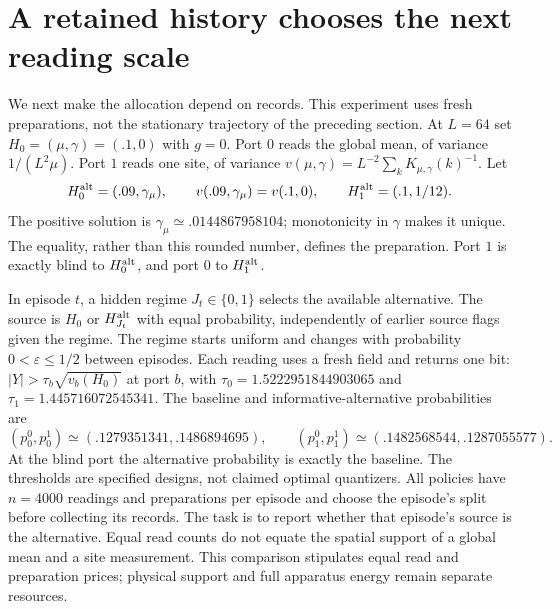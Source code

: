 \documentclass[12pt,a4paper]{article}
\begin{document}
\section{A retained history chooses the next reading scale}
\label{sec:history-scale}

We next make the allocation depend on records. This experiment uses
fresh preparations, not the stationary trajectory of the preceding
section. At $L=64$ set $H_0=(\mu,\gamma)=(.1,0)$ with $g=0$.
Port $0$ reads the global mean, of variance $1/(L^2\mu)$.
Port $1$ reads one site, of variance
$v(\mu,\gamma)=L^{-2}\sum_k K_{\mu,\gamma}(k)^{-1}$.
Let
\[
 H_0^{\rm alt}=(.09,\gamma_\mu),\qquad
 v(.09,\gamma_\mu)=v(.1,0),\qquad
 H_1^{\rm alt}=(.1,1/12).
\]
The positive solution is $\gamma_\mu\simeq .0144867958104$;
monotonicity in $\gamma$ makes it unique. The equality, rather than
this rounded number, defines the preparation. Port $1$ is exactly
blind to $H_0^{\rm alt}$, and port $0$ to $H_1^{\rm alt}$.

In episode $t$, a hidden regime $J_t\in\{0,1\}$ selects the available
alternative. The source is $H_0$ or $H_{J_t}^{\rm alt}$ with equal
probability, independently of earlier source flags given the regime.
The regime starts uniform and changes with probability
$0<\varepsilon\leq1/2$ between episodes. Each reading uses a fresh
field and returns one bit:
$|Y|>\tau_b\sqrt{v_b(H_0)}$ at port $b$, with
$\tau_0=1.5222951844903065$ and $\tau_1=1.445716072545341$.
The baseline and informative-alternative probabilities are
\begin{equation}\label{eq:blind-probabilities}
 (p_0^0,p_0^1)\simeq(.1279351341,.1486894695),\qquad
 (p_1^0,p_1^1)\simeq(.1482568544,.1287055577).
\end{equation}
At the blind port the alternative probability is exactly the baseline.
The thresholds are specified designs, not claimed optimal quantizers.
All policies have $n=4000$ readings and preparations per episode and
choose the episode's split before collecting its records. The task is
to report whether that episode's source is the alternative.
Equal read counts do not equate the spatial support of a global mean
and a site measurement. This comparison stipulates equal read and
preparation prices; physical support and full apparatus energy remain
separate resources.
\end{document}
